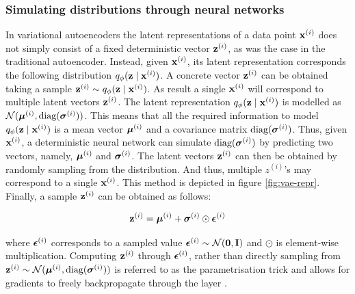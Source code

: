 
\subsubsection{Simulating distributions through neural networks}
In variational autoencoders the latent representations of a data point $\mathbf{x}^{(i)}$ does not simply consist of a fixed deterministic vector $\mathbf{z}^{(i)}$, as was the case in the traditional autoencoder. Instead, given $\mathbf{x}^{(i)}$, its latent representation corresponds the following distribution $q_\phi (\mathbf{z} \mid \mathbf{x}^{(i)})$.
A concrete vector $\mathbf{z}^{(i)}$ can be obtained taking a sample $\mathbf{z}^{(i)} \sim q_\phi (\mathbf{z} \mid \mathbf{x}^{(i)})$. As result a single $\mathbf{x}^{(i)}$ will correspond to multiple latent vectors $\mathbf{z}^{(i)}$. The latent representation $q_\phi (\mathbf{z} \mid \mathbf{x}^{(i)})$ is modelled as $\mathcal{N}(\bm{\mu}^{(i)}, \text{diag}(\bm{\sigma}^{(i)}))$. This means that all the required information to model $q_\phi (\mathbf{z} \mid \mathbf{x}^{(i)})$ is a mean vector $\bm{\mu}^{(i)}$ and a covariance matrix $\text{diag}(\bm{\sigma}^{(i)})$. Thus, given $\mathbf{x}^{(i)}$, a deterministic neural network can simulate $\text{diag}(\bm{\sigma}^{(i)})$ by predicting two vectors, namely, $\bm{\mu}^{(i)}$ and $\bm{\sigma}^{(i)}$. The latent vectors $\mathbf{z}^{(i)}$ can then be obtained by randomly sampling from the distribution. And thus, multiple $z^{(i)}$'s may correspond to a single $\mathbf{x}^{(i)}$. This method is depicted in figure \ref{fig:vae-repr}. Finally, a sample $\mathbf{z}^{(i)}$ can be obtained as follows:

\begin{equation}
\mathbf{z}^{(i)} = \bm{\mu}^{(i)} + \bm{\sigma}^{(i)} \odot \bm{\epsilon}^{(i)}
\end{equation}

where $\bm{\epsilon}^{(i)}$ corresponds to a sampled value $\bm{\epsilon}^{(i)} \sim \mathcal{N}(\bm{\mathbf{0}}, \mathbf{I})$ and $\odot$ is element-wise multiplication. Computing $\mathbf{z}^{(i)}$ through $\bm{\epsilon}^{(i)}$, rather than directly sampling from $\mathbf{z}^{(i)} \sim \mathcal{N}(\bm{\mu}^{(i)}, \text{diag}(\bm{\sigma}^{(i)}))$ is referred to as the parametrisation trick and allows for gradients to freely backpropagate through the layer \cite{davidfosterVariationalAutoencoders2023}.


